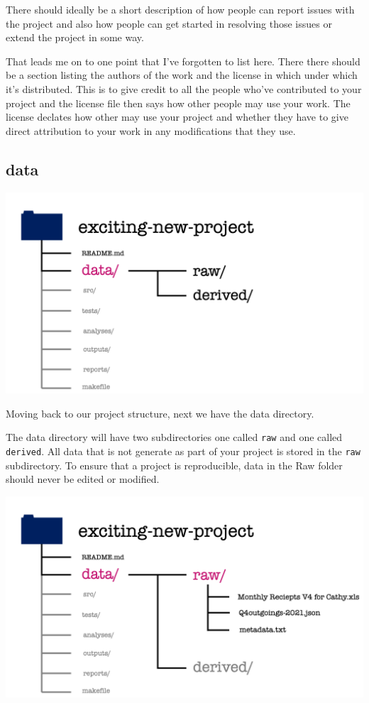 \documentclass[
  12pt,
]{book}
\begin{document}
There should ideally be a short description of how people can report issues with the project and also how people can get started in resolving those issues or extend the
project in some way.

That leads me on to one point that I've forgotten to list here. There there should be a section listing the authors of the work and the license in which under which it's
distributed. This is to give credit to all the people who've contributed to
your project and the license file then says how other people may use your work. The license declates how other may use your project and whether they have to give direct
attribution to your work in any modifications that they use.

\hypertarget{data}{%
\subsection{data}\label{data}}

\includegraphics[width=0.8\linewidth]{images/101-workflows-organising-your-work/directory-structure-drawings/directory-structure-drawing-7}

Moving back to our project structure, next we have the data directory.

The data directory will have two subdirectories one called \texttt{raw} and one called \texttt{derived}. All data that is not generate as part of your project is stored in the \texttt{raw} subdirectory. To ensure that a project is reproducible, data in the Raw folder should never be edited or modified.

\includegraphics[width=0.8\linewidth]{images/101-workflows-organising-your-work/directory-structure-drawings/directory-structure-drawing-8}
\end{document}
